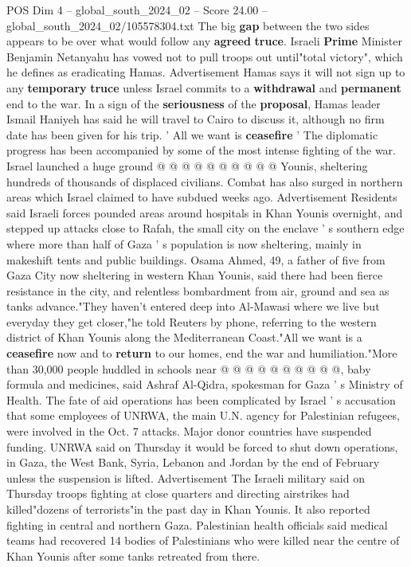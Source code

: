 \begin{textsample}{POS Dim 4 – global\_south\_2024\_02 – Score 24.00 – global\_south\_2024\_02/105578304.txt}
The big \textbf{gap} between the two sides appears to be over what would follow any \textbf{agreed} \textbf{truce}.
Israeli \textbf{Prime} Minister Benjamin Netanyahu has vowed not to pull troops out until"total victory", which he defines as eradicating Hamas.
Advertisement Hamas says it will not sign up to any \textbf{temporary} \textbf{truce} unless Israel commits to a \textbf{withdrawal} and \textbf{permanent} end to the war.
In a sign of the \textbf{seriousness} of the \textbf{proposal}, Hamas leader Ismail Haniyeh has said he will travel to Cairo to discuss it, although no firm date has been given for his trip. ' All we want is \textbf{ceasefire} ' The diplomatic progress has been accompanied by some of the most intense fighting of the war.
Israel launched a huge ground @ @ @ @ @ @ @ @ @ @ Younis, sheltering hundreds of thousands of displaced civilians.
Combat has also surged in northern areas which Israel claimed to have subdued weeks ago.
Advertisement Residents said Israeli forces pounded areas around hospitals in Khan Younis overnight, and stepped up attacks close to Rafah, the small city on the enclave ' s southern edge where more than half of Gaza ' s population is now sheltering, mainly in makeshift tents and public buildings.
Osama Ahmed, 49, a father of five from Gaza City now sheltering in western Khan Younis, said there had been fierce resistance in the city, and relentless bombardment from air, ground and sea as tanks advance."They haven't entered deep into Al-Mawasi where we live but everyday they get closer,"he told Reuters by phone, referring to the western district of Khan Younis along the Mediterranean Coast."All we want is a \textbf{ceasefire} now and to \textbf{return} to our homes, end the war and humiliation."More than 30,000 people huddled in schools near @ @ @ @ @ @ @ @ @ @, baby formula and medicines, said Ashraf Al-Qidra, spokesman for Gaza ' s Ministry of Health.
The fate of aid operations has been complicated by Israel ' s accusation that some employees of UNRWA, the main U.N. agency for Palestinian refugees, were involved in the Oct. 7 attacks.
Major donor countries have suspended funding.
UNRWA said on Thursday it would be forced to shut down operations, in Gaza, the West Bank, Syria, Lebanon and Jordan by the end of February unless the suspension is lifted.
Advertisement The Israeli military said on Thursday troops fighting at close quarters and directing airstrikes had killed"dozens of terrorists"in the past day in Khan Younis.
It also reported fighting in central and northern Gaza.
Palestinian health officials said medical teams had recovered 14 bodies of Palestinians who were killed near the centre of Khan Younis after some tanks retreated from there.

\end{textsample}
